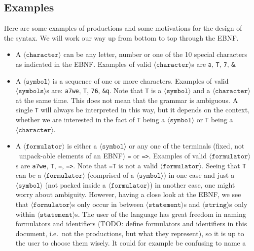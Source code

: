 \documentclass[british]{article}
\newcommand\prv{bc}
\newcommand\m[1]{\texttt{#1}}
\begin{document}
\subsection{Examples}

Here are some examples of productions and some motivations for the
design of the syntax. We will work our way up from bottom to top through
the EBNF\@.

\begin{itemize}
	\item
		A $\langle\texttt{character}\rangle$ can be any letter, number or
		one of the 10 special characters as indicated in the EBNF\@. Examples
		of valid $\langle\texttt{character}\rangle$s are \m{a}, \m{T},
		\m{7}, \m{&}.
	\item
		A $\langle\texttt{symbol}\rangle$ is a sequence of one or more
		characters. Examples of valid $\langle\texttt{symbols}\rangle$s are:
		\m{a7we}, \m{T}, \m{76}, \m{&q}. Note that \m{T} is a 
		$\langle\texttt{symbol}\rangle$ and a $\langle\texttt{character}\rangle$
		at the same time. This does not mean that the grammar is ambiguous.
		A single \m{T} will always be interpreted in this way, but it depends
		on the context, whether we are interested in the fact of \m{T} being a
		$\langle\texttt{symbol} \rangle$ or \m{T} being a 
		$\langle\texttt{character}\rangle$.
	\item
		A $\langle\texttt{formulator}\rangle$ is either a
		$\langle\texttt{symbol}\rangle$ or any one of the terminals (fixed, not
		\textquotedbl\ unpack-able \textquotedbl{} elements of an EBNF) \m{=} or
		\m{=>}. Examples of valid $\langle\texttt{formulator}\rangle$s are
		\m{a7we}, \m{T}, \m{=}, \m{=>}.  Note that \m{=T} is not a valid
		$\langle\texttt{formulator}\rangle$.  Seeing that \m{T} can be a
		$\langle\texttt{formulator}\rangle$ (comprised of a
		$\langle\texttt{symbol}\rangle$) in one case and just a
		$\langle\texttt{symbol}\rangle$ (not packed inside a
		$\langle\texttt{formulator}\rangle$) in another case, one might worry
		about ambiguity. However, having a close look at the EBNF, we see that
		$\langle\texttt{formulator}\rangle$s only occur in between
		$\langle\texttt{statement}\rangle$s and $\langle\texttt{string}\rangle$s
		only within $\langle\texttt{statement}\rangle$s. The user of the
		language has great freedom in naming formulators and identifiers
		(TODO\@: define formulators and identifiers in this document, i.e.\ not
		the productions, but what they represent), so it is up to the user to
		choose them wisely. It could for example be confusing to name a

\end{itemize}
\end{document}
